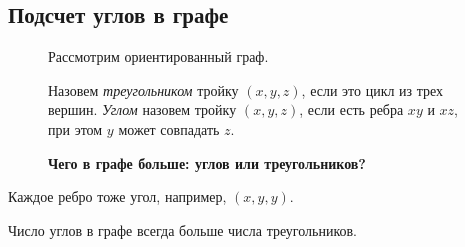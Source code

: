 \subsection{Подсчет углов в графе}
\begin{figure}[h]
	\begin{minipage}{0.7\textwidth}
Рассмотрим ориентированный граф.

Назовем \textit{треугольником} тройку $ (x, y, z)$, если это цикл из трех вершин. \textit{Углом} назовем тройку  $ (x, y, z)$, если есть ребра  $ xy$ и $xz$, при этом  $ y $ может совпадать  $ z$.

\textbf{Чего в графе больше: углов или треугольников?}
	\end{minipage}
	\begin{minipage}{0.25\textwidth}
	\end{minipage}
\end{figure}
\begin{note}
	Каждое ребро тоже угол, например, $ (x, y, y)$.
\end{note}
\begin{thm}
    Число углов в графе всегда больше числа треугольников.
\end{thm}
